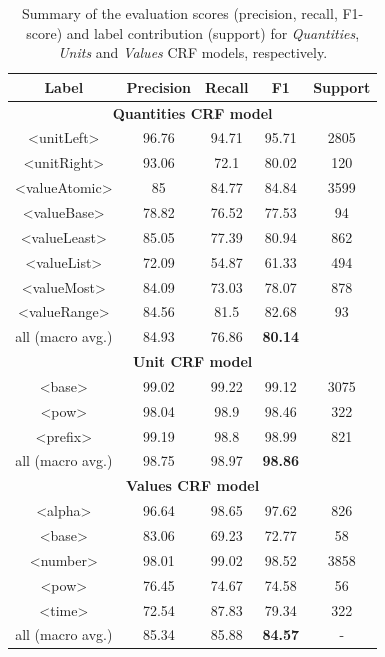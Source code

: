 \documentclass[sigconf]{acmart}
\begin{document}
\begin{table}[ht]
   \caption{Summary of the evaluation scores (precision, recall, F1-score) and label contribution (support) for \textit{Quantities}, \textit{Units} and \textit{Values} CRF models, respectively. }
   \label{tab:quantities-evaluation}
   \begin{tabular}{c|cccc}
        \toprule
        Label & Precision & Recall & F1 & Support\\
        \toprule
        \multicolumn{5}{c}{\textbf{Quantities CRF model}}\\
        \midrule
        <unitLeft>          & 96.76 & 94.71 & 95.71 & 2805  \\
        <unitRight>         & 93.06 & 72.1  & 80.02 & 120   \\
        <valueAtomic>       & 85    & 84.77 & 84.84 & 3599  \\
        <valueBase>         & 78.82 & 76.52 & 77.53 & 94    \\
        <valueLeast>        & 85.05 & 77.39 & 80.94 & 862   \\
        <valueList>         & 72.09 & 54.87 & 61.33 & 494   \\
        <valueMost>         & 84.09 & 73.03 & 78.07 & 878   \\
        <valueRange>        & 84.56 & 81.5  & 82.68 & 93    \\
        all (macro avg.)    & 84.93 & 76.86 & \textbf{80.14}\\
        \midrule
        \multicolumn{5}{c}{\textbf{Unit CRF model}}\\
        \midrule
        <base>              & 99.02 & 99.22 & 99.12 & 3075      \\
        <pow>               & 98.04 & 98.9  & 98.46 & 322       \\
        <prefix>            & 99.19 & 98.8  & 98.99 & 821       \\
        all (macro avg.)    & 98.75 & 98.97 & \textbf{98.86}    \\
        \midrule
        \multicolumn{5}{c}{\textbf{Values CRF model}}\\
        \midrule
        <alpha>             & 96.64  & 98.65 & 97.62  & 826      \\
        <base>              & 83.06  & 69.23 & 72.77  & 58       \\
        <number>            & 98.01  & 99.02 & 98.52  & 3858     \\
        <pow>               & 76.45  & 74.67 & 74.58  & 56       \\
        <time>              & 72.54  & 87.83 & 79.34  & 322      \\
        all (macro avg.)    & 85.34  & 85.88 & \textbf{84.57} & -\\
        \bottomrule
   \end{tabular}
\end{table}
\end{document}
